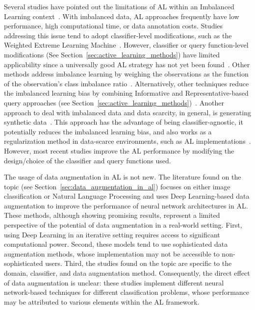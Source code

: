 \documentclass[10pt,journal,compsoc]{IEEEtran}
\begin{document}
Several studies have pointed out the limitations of AL within an Imbalanced
Learning context~\cite{Yu2019, zhang2020reinforcement}. With imbalanced data,
AL approaches frequently have low performance, high computational time, or
data annotation costs.  Studies addressing this issue tend to adopt
classifier-level modifications, such as the Weighted Extreme Learning
Machine~\cite{Yu2019, Zong2013, Qin2021}. However, classifier or query
function-level modifications (See Section~\ref{sec:active_learning_methods})
have limited applicability since a universally good AL strategy has not yet
been found~\cite{Sener2018}. Other methods address imbalance learning by
weighing the observations as the function of the observation's class imbalance
ratio~\cite{Liu2021}.  Alternatively, other techniques reduce the imbalanced
learning bias by combining Informative and Representative-based query
approaches (see Section~\ref{sec:active_learning_methods})~\cite{Tharwat2020}.
Another approach to deal with imbalanced data and data scarcity, in general,
is generating synthetic data~\cite{he2009learning}. This approach has the
advantage of being classifier-agnostic, it potentially reduces the imbalanced
learning bias, and also works as a regularization method in data-scarce
environments, such as AL implementations~\cite{Kim2021}. However, most recent
studies improve the AL performance by modifying the design/choice of the
classifier and query functions used.
 
The usage of data augmentation in AL is not new. The literature found on the
topic (see Section~\ref{sec:data_augmentation_in_al}) focuses on either image
classification or Natural Language Processing and uses Deep Learning-based
data augmentation to improve the performance of neural network architectures
in AL\@. These methods, although showing promising results, represent a
limited perspective of the potential of data augmentation in a real-world
setting. First, using Deep Learning in an iterative setting requires access to
significant computational power. Second, these models tend to use
sophisticated data augmentation methods, whose implementation may not be
accessible to non-sophisticated users. Third, the studies found on the topic
are specific to the domain, classifier, and data augmentation method.
Consequently, the direct effect of data augmentation is unclear: these studies
implement different neural network-based techniques for different
classification problems, whose performance may be attributed to various
elements within the AL framework.
\end{document}
